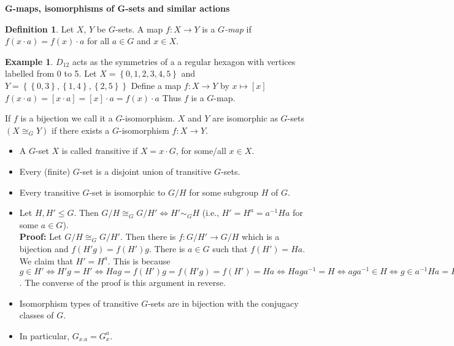 \documentclass[12pt]{amsart}
\theoremstyle{definition}
\newtheorem{example}[theorem]{Example}
\newtheorem{definition}[theorem]{Definition}
\begin{document}
\begin{center}
\textbf{G-maps, isomorphisms of G-sets and similar actions}
\end{center}

\begin{definition}
Let $X$, $Y$ be $G$-sets. A map $f : X \rightarrow Y$ is a \emph{$G$-map} if $f(x \cdot a ) = f(x) \cdot a$ for all $a \in G$ and $x \in X$.
\end{definition}

\begin{example}
$D_{12}$ acts as the symmetries of a a regular hexagon with vertices labelled from 0 to 5.
Let $X = \left\{ 0, 1, 2, 3, 4, 5 \right\}$ and $Y = \left\{ \left\{0, 3 \right\}, \left\{ 1, 4 \right\}, \left\{ 2, 5 \right\} \right\}$
Define a map $f: X \rightarrow Y$ by $x \mapsto [ x ]$
$f( x \cdot a ) = [ x \cdot a ] = [ x ] \cdot a = f( x ) \cdot a$
Thus $f$ is a $G$-map.
\end{example}

 If $f$ is a bijection we call it a $G$-isomorphism. $X$ and $Y$ are isomorphic as $G$-sets $\left( X \cong_{G} Y \right)$ if there exists a $G$-isomorphism $f: X \rightarrow Y$.

\begin{itemize}
\item A $G$-set $X$ is called \emph transitive if $X = x \cdot G$, for some/all $x \in X$.
\item Every (finite) $G$-set is a disjoint union of transitive $G$-sets.
\item Every transitive $G$-set is isomorphic to $G / H$ for some subgroup $H$ of $G$.
\item Let $H, H'\leq G$.  Then $G/H\cong_G G/H'\Leftrightarrow H'\sim_G H$ (i.e., $H'=H^a=a^{-1}Ha$ for some $a\in G$).\\
\textbf{Proof:} Let $G/H\cong_G G/H'$.  Then there is $f:G/H'\rightarrow G/H$ which is a bijection and $f(H'g)=f(H')g$.  There is $a\in G$ such that $f(H')=Ha$.  We claim that $H'=H^a$.  This is because $g\in H'\Leftrightarrow H'g=H'\Leftrightarrow Hag=f(H')g=f(H'g)=f(H')=Ha\Leftrightarrow Haga^{-1}=H\Leftrightarrow aga^{-1}\in H\Leftrightarrow g\in a^{-1}Ha=H$.  The converse of the proof is this argument in reverse.
\item Isomorphism types of transitive $G$-sets are in bijection with the conjugacy classes of $G$.
\item In particular, $G_{x.a}=G_x^a$.
\end{itemize}
\end{document}
